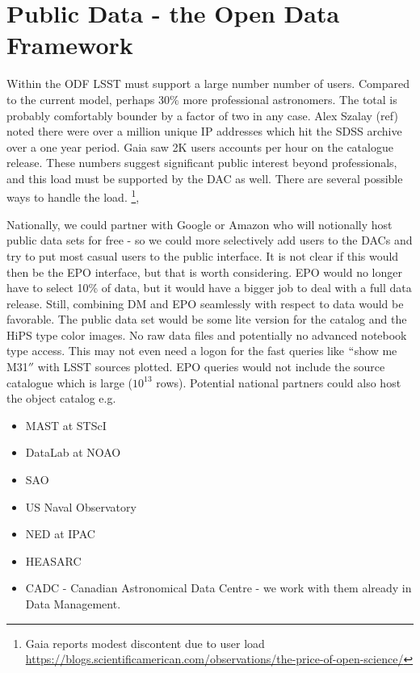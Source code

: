 \section{Public Data - the Open Data Framework}\label{sec:public}

Within the ODF LSST must support a large number number of users. Compared to the current model, perhaps 30$\%$ more professional astronomers. The total is probably comfortably bounder by a factor of two in any case.
Alex Szalay (ref) noted there were over a million unique IP addresses which hit the SDSS archive over a one year period.  Gaia saw 2K users accounts per hour on the catalogue release. These numbers suggest significant public interest beyond professionals, and this load must be supported by the DAC as well. There are several possible ways to handle the load. 
\footnote{Gaia reports modest discontent due to user load \url{https://blogs.scientificamerican.com/observations/the-price-of-open-science/}},

Nationally, we could partner with Google or Amazon who will notionally host public data sets for free - so we could more selectively add users to the DACs and try to put most casual users to the public interface. It is not clear if this would then be the EPO interface, but that is worth considering. EPO would no longer have to select 10\% of data, but it would have a bigger job to deal with a full data release. Still, combining DM and EPO seamlessly with respect to data would be favorable.
The public data set would be some lite version for the catalog   and the HiPS type color images. No raw data files and potentially no advanced notebook type access. This may not even need a logon for the fast queries like $``$show me M31$''$ with LSST sources plotted. EPO queries would not include the source catalogue which is large ($10^{13}$ rows).
Potential national partners  could also host the object catalog e.g.

\begin{itemize}
 \item MAST at STScI
 \item DataLab at NOAO
 \item SAO
 \item US Naval Observatory
 \item NED at IPAC
 \item HEASARC
 \item CADC - Canadian Astronomical Data Centre - we work with them already in Data Management.
\end{itemize}

